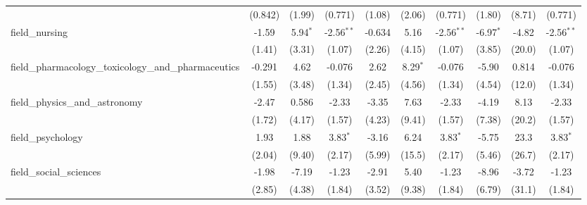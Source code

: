 \begin{tabular}{lccccccccc}
                                                               & (0.842)        & (1.99)         & (0.771)       & (1.08)         & (2.06)         & (0.771)       & (1.80)        & (8.71)        & (0.771)\\   
   field\_nursing                                              & -1.59          & 5.94$^{*}$     & -2.56$^{**}$  & -0.634         & 5.16           & -2.56$^{**}$  & -6.97$^{*}$   & -4.82         & -2.56$^{**}$\\   
                                                               & (1.41)         & (3.31)         & (1.07)        & (2.26)         & (4.15)         & (1.07)        & (3.85)        & (20.0)        & (1.07)\\   
   field\_pharmacology\_toxicology\_and\_pharmaceutics         & -0.291         & 4.62           & -0.076        & 2.62           & 8.29$^{*}$     & -0.076        & -5.90         & 0.814         & -0.076\\   
                                                               & (1.55)         & (3.48)         & (1.34)        & (2.45)         & (4.56)         & (1.34)        & (4.54)        & (12.0)        & (1.34)\\   
   field\_physics\_and\_astronomy                              & -2.47          & 0.586          & -2.33         & -3.35          & 7.63           & -2.33         & -4.19         & 8.13          & -2.33\\   
                                                               & (1.72)         & (4.17)         & (1.57)        & (4.23)         & (9.41)         & (1.57)        & (7.38)        & (20.2)        & (1.57)\\   
   field\_psychology                                           & 1.93           & 1.88           & 3.83$^{*}$    & -3.16          & 6.24           & 3.83$^{*}$    & -5.75         & 23.3          & 3.83$^{*}$\\   
                                                               & (2.04)         & (9.40)         & (2.17)        & (5.99)         & (15.5)         & (2.17)        & (5.46)        & (26.7)        & (2.17)\\   
   field\_social\_sciences                                     & -1.98          & -7.19          & -1.23         & -2.91          & 5.40           & -1.23         & -8.96         & -3.72         & -1.23\\   
                                                               & (2.85)         & (4.38)         & (1.84)        & (3.52)         & (9.38)         & (1.84)        & (6.79)        & (31.1)        & (1.84)\\   

\end{tabular}
